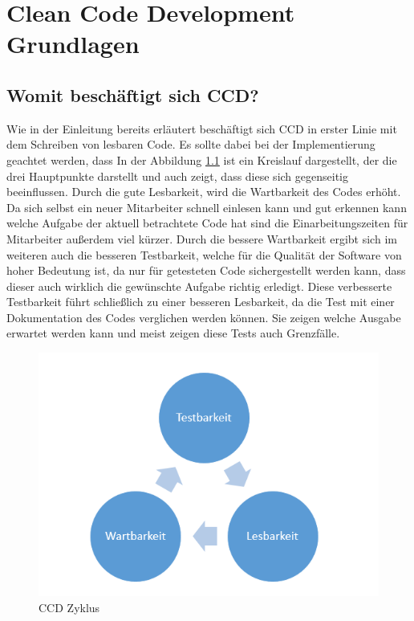\chapter{Clean Code Development Grundlagen}
\section{Womit beschäftigt sich CCD?}
\SuperPar Wie in der Einleitung bereits erläutert beschäftigt sich CCD in erster Linie mit dem Schreiben von lesbaren Code. Es sollte dabei bei der Implementierung geachtet werden, dass
In der Abbildung \ref{fig:cycle} ist ein Kreislauf dargestellt, der die drei Hauptpunkte darstellt und auch zeigt, dass diese sich gegenseitig beeinflussen. Durch die gute Lesbarkeit, wird die Wartbarkeit des Codes erhöht. Da sich selbst ein neuer Mitarbeiter schnell einlesen kann und gut erkennen kann welche Aufgabe der aktuell betrachtete Code hat sind die Einarbeitungszeiten für Mitarbeiter außerdem viel kürzer. Durch die bessere Wartbarkeit ergibt sich im weiteren auch die besseren Testbarkeit, welche für die Qualität der Software von hoher Bedeutung ist, da nur für getesteten Code sichergestellt werden kann, dass dieser auch wirklich die gewünschte Aufgabe richtig erledigt. Diese verbesserte Testbarkeit führt schließlich zu einer besseren Lesbarkeit, da die Test mit einer Dokumentation des Codes verglichen werden können. Sie zeigen welche Ausgabe erwartet werden kann und meist zeigen diese Tests auch Grenzfälle.

\begin{figure}[h]
	\centering
		\includegraphics[width=1.00\textwidth]{images/cycle.PNG}
	\caption{CCD Zyklus}
	\label{fig:cycle}
\end{figure}

